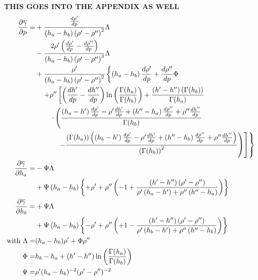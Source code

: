 \documentclass[11pt]{article} %
\begin{document}
\begin{sidewaysfigure}
\textbf{THIS GOES INTO THE APPENDIX AS WELL}
\begin{align}
\frac{\partial \overline{\gamma}}{\partial p} =& + {
  \frac{\frac{d\rhop}{dp}}{\left( h_a-h_b \right) \left( \rhop-\rhopp \right)^2} 
  \Lambda } \nonumber \\ 
& - {
  \frac{2 \rhop \left( \frac{d\rhop}{dp} - \frac{d\rhopp}{dp} \right)}{\left( h_a-h_b \right) \left( \rhop-\rhopp \right)^3} 
  \Lambda } \nonumber \\
& + {
  \frac{\rhop}{\left( h_a-h_b \right) \left( \rhop-\rhopp \right)^2} \left\lbrace{
    { \left( h_a-h_b \right) {\frac{d\rhop}{dp} } } + \frac{d\rhopp}{dp} 
  \Phi }\right. } \nonumber \\
& \quad \left.{ + \rhopp \left[{
  \left({ \frac {d\hp}{dp} - \frac{d\hpp}{dp} }\right) \ln \left({ \frac{\Gamma(h_a)}{\Gamma(h_b)} }\right)
  + \frac{\left( \hp-\hpp \right) \left( \Gamma(h_b)  \right) }
      { \Gamma(h_a) }
}\right. }\right. \nonumber \\
& \quad \quad \left.{ \left.{ \cdot \left({
  \frac{ \left( h_a-\hp \right) \frac{d\rhop}{dp} - \rhop \frac{d\hp}{dp} 
    + \left( \hpp-h_a \right) \frac{d\rhopp}{dp} + \rhopp \frac{d\hpp}{dp}}
    {\Gamma(h_b)}
}\right.}\right.}\right. \nonumber \\ 
& \quad \quad \quad \left.{ \left.{ \left.{ -
\frac{ \left( \Gamma(h_a) \right) 
          \left( \left( h_b-\hp \right) \frac{d\rhop}{dp} - \rhop \frac{d\hp}{dp} + 
               \left( \hpp-h_b \right) \frac{d\rhopp}{dp} + \rhopp \frac{d\hpp}{dp}
          \right) 
        }{ \left( \Gamma(h_b) \right)^2 }
        } \right) 
} \right]  }\right\rbrace
%
%
\label{eqn:dgammabardpalt} \\
%
\frac{\partial \overline{\gamma}}{\partial h_a} =&
-{\Psi\Lambda} \nonumber \\ 
&+{\Psi\left(h_a-h_b\right)\left\lbrace+\rhop+\rhopp\left(-1+{\frac{\left(\hp-\hpp\right)\left(\rhop-\rhopp\right)}{\rhop\left(h_a-\hp\right)+\rhopp\left(\hpp-h_a\right)}}\right)\right\rbrace} \label{eqn:dgammabardhaalt} \\
%
\frac{\partial \overline{\gamma}}{\partial h_b} =&
+{\Psi\Lambda} \nonumber \\
&+{\Psi\left(h_a-h_b\right)\left\lbrace-\rhop+\rhopp\left(+1-{\frac{\left(\hp-\hpp\right)\left(\rhop-\rhopp\right)}{\rhop\left(h_b-\hp\right)+\rhopp\left(\hpp-h_b\right)}}\right)\right\rbrace}\label{eqn:dgammabardhbalt} \\
%
\text{ with } \Lambda =& (h_a-h_b)\rhop+\Phi\rhopp \\
\Phi =& h_b-h_a+(\hp-\hpp)\ln\left(\frac{\Gamma(h_a)}{\Gamma(h_b)}\right) \\
\Psi =& \rhop (h_a-h_b)^{-2} (\rhop-\rhopp)^{-2}
%
\end{align}
\end{sidewaysfigure}
\end{document}
